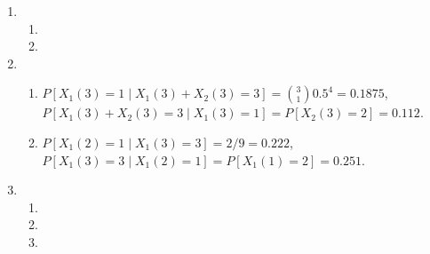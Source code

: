 \documentclass{article}
\begin{document}
\begin{enumerate}
    \item\begin{enumerate}[label=\alph*)]
        \item
        \item
    \end{enumerate}
    
    \item\begin{enumerate}[label=\alph*)]
        \item $P[X_1(3) = 1\mid X_1(3)+X_2(3)=3] = \binom{3}{1} 0.5^4 = 0.1875$, $P[X_1(3)+X_2(3)= 3\mid X_1(3)=1]=P[X_2(3)=2]=0.112$.
        \item $P[X_1(2)=1\mid X_1(3)=3] = 2/9 = 0.222$, $P[X_1(3)=3\mid X_1(2)=1]=P[X_1(1)=2]=0.251$.
    \end{enumerate}
    
    \item\begin{enumerate}[label=\alph*)]
        \item
        \item
        \item
    \end{enumerate}
\end{enumerate}
\end{document}
